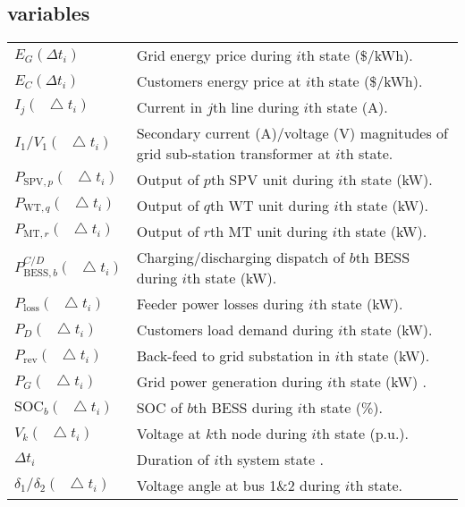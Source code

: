 \documentclass[journal]{IEEEtran}
\newcommand*\Laplace{\mathop{}\!\mathbin\bigtriangleup}
\begin{document}
    \subsection{variables}
   \renewcommand{\arraystretch}{0.95}
	\begin{supertabular}[l]{p{55pt} p{190pt}}
	 ${{E}_{G}}\left( \Delta {{t}_{i}} \right)$ & Grid energy price during $i$th state ($\$$/kWh). \\
	 ${{E}_{C}}\left( \Delta {{t}_{i}} \right)$ & Customers energy price at $i$th state (\$/kWh). \\
	 ${{I}_{j}}(\Laplace {{t}_{i}})$ & Current  in $j$th line during $i$th state (A). \\
	 $I_{1}^{{}}/{{V}_{1}}(\Laplace {{t}_{i}})$ & Secondary current (A)/voltage (V) magnitudes of grid sub-station transformer at $i$th state. \\
	 ${{P}_{\text{SPV},p}}(\Laplace {{t}_{i}})$ & Output of $p$th SPV unit during $i$th state (kW). \\
	 ${{P}_{\text{WT},q}}(\Laplace {{t}_{i}})$ & Output of $q$th WT unit during $i$th state (kW). \\
	 ${{P}_{\text{MT},r}}(\Laplace {{t}_{i}})$ & Output of $r$th MT unit during $i$th state (kW). \\
	 $P_{\text{BESS},b}^{C/D}(\Laplace {{t}_{i}})$ & Charging/discharging dispatch of $b$th BESS during $i$th state (kW). \\
	 ${{P}_{\text{loss}}}(\Laplace {{t}_{i}})$ & Feeder power losses during $i$th state (kW). \\
	 ${{P}_{D}}(\Laplace {{t}_{i}})$ & Customers load demand during $i$th state (kW). \\
	 ${{P}_{\text{rev}}}(\Laplace {{t}_{i}})$ & Back-feed to grid substation in $i$th state (kW). \\
	 ${{P}_{G}}(\Laplace {{t}_{i}})$ & Grid power generation during $i$th state (kW) . \\
	 ${\text{SOC}}_{b}(\Laplace {{t}_{i}})$ & SOC of $b$th BESS during $i$th state (\%). \\
	 ${{V}_{k}}(\Laplace {{t}_{i}})$ & Voltage at $k$th node during $i$th state (p.u.). \\
	 $\Delta {{t}_{i}}$ & Duration of $i$th system state . \\
	 ${{\delta }_{1}/{\delta }_{2}}(\Laplace{{t}_{i}})$ & Voltage angle at bus 1\&2 during $i$th state. \\%
    \end{supertabular}
\end{document}
